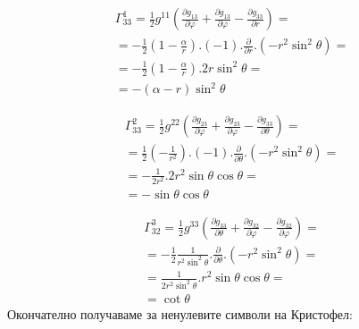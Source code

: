 \documentclass[a4paper,12pt]{article}
\begin{document}
    \begin{equation}
        \begin{aligned}
        \varGamma^1_{33} = \frac{1}{2}g^{11}\left(\frac{\partial g_{13}}{\partial \varphi} + \frac{\partial g_{13}}{\partial \varphi} - \frac{\partial g_{33}}{\partial r}\right) =\\
        = -\frac{1}{2}\left(1- \frac{\alpha}{r}\right).(-1).\frac{\partial}{\partial r}.(-r^2\sin^2\theta) = \\
        = -\frac{1}{2} \left(1-\frac{\alpha}{r}\right).2r\sin^2\theta = \\
        = - (\alpha - r)\sin^2\theta
        \end{aligned}
    \end{equation}
    \newline

    \begin{equation}
        \begin{aligned}
        \varGamma^2_{33} = \frac{1}{2}g^{22}\left(\frac{\partial g_{23}}{\partial \varphi} + \frac{\partial g_{23}}{\partial \varphi} - \frac{\partial g_{33}}{\partial \theta}\right) =\\
        = \frac{1}{2}\left(- \frac{1}{r^2}\right).(-1).\frac{\partial}{\partial \theta}.(-r^2\sin^2\theta) = \\
        = -\frac{1}{2r^2}.2r^2\sin\theta\cos\theta = \\
        = -\sin\theta\cos\theta
        \end{aligned}
    \end{equation}
    \newline

    \begin{equation}
        \begin{aligned}
        \varGamma^3_{32} = \frac{1}{2}g^{33}\left(\frac{\partial g_{33}}{\partial \theta} + \frac{\partial g_{32}}{\partial \varphi} - \frac{\partial g_{32}}{\partial \varphi}\right) =\\
        = -\frac{1}{2}\frac{1}{r^2\sin^2\theta}.\frac{\partial}{\partial \theta}.(-r^2\sin^2\theta) = \\
        = \frac{1}{2r^2\sin^2\theta}.r^2\sin\theta\cos\theta = \\
        = \cot\theta
        \end{aligned}
    \end{equation}
    \newline
    Окончателно получаваме за ненулевите символи на Кристофел:
\end{document}
